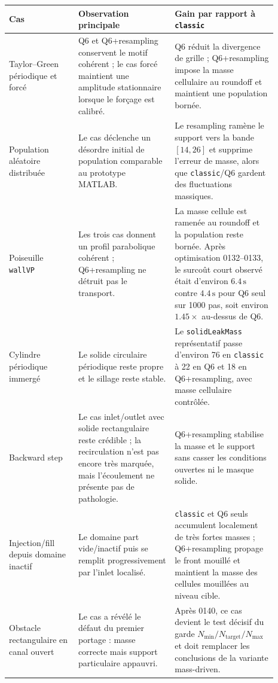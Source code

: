 \documentclass[11pt,a4paper]{article}
\begin{document}
\begin{center}
\small
\begin{tabular}{p{0.23\linewidth}p{0.32\linewidth}p{0.34\linewidth}}
\toprule
Cas & Observation principale & Gain par rapport à \texttt{classic} \\
\midrule
Taylor--Green périodique et forcé & Q6 et Q6+resampling conservent le motif cohérent ; le cas forcé maintient une amplitude stationnaire lorsque le forçage est calibré. & Q6 réduit la divergence de grille ; Q6+resampling impose la masse cellulaire au roundoff et maintient une population bornée. \\
Population aléatoire distribuée & Le cas déclenche un désordre initial de population comparable au prototype MATLAB. & Le resampling ramène le support vers la bande $[14,26]$ et supprime l'erreur de masse, alors que \texttt{classic}/Q6 gardent des fluctuations massiques. \\
Poiseuille \texttt{wallVP} & Les trois cas donnent un profil parabolique cohérent ; Q6+resampling ne détruit pas le transport. & La masse cellule est ramenée au roundoff et la population reste bornée. Après optimisation 0132--0133, le surcoût court observé était d'environ $6.4\,\mathrm{s}$ contre $4.4\,\mathrm{s}$ pour Q6 seul sur 1000 pas, soit environ $1.45\times$ au-dessus de Q6. \\
Cylindre périodique immergé & Le solide circulaire périodique reste propre et le sillage reste stable. & Le \texttt{solidLeakMass} représentatif passe d'environ 76 en \texttt{classic} à 22 en Q6 et 18 en Q6+resampling, avec masse cellulaire contrôlée. \\
Backward step & Le cas inlet/outlet avec solide rectangulaire reste crédible ; la recirculation n'est pas encore très marquée, mais l'écoulement ne présente pas de pathologie. & Q6+resampling stabilise la masse et le support sans casser les conditions ouvertes ni le masque solide. \\
Injection/fill depuis domaine inactif & Le domaine part vide/inactif puis se remplit progressivement par l'inlet localisé. & \texttt{classic} et Q6 seuls accumulent localement de très fortes masses ; Q6+resampling propage le front mouillé et maintient la masse des cellules mouillées au niveau cible. \\
Obstacle rectangulaire en canal ouvert & Le cas a révélé le défaut du premier portage : masse correcte mais support particulaire appauvri. & Après 0140, ce cas devient le test décisif du garde $N_{\min}/N_{\mathrm{target}}/N_{\max}$ et doit remplacer les conclusions de la variante mass-driven. \\
\bottomrule
\end{tabular}
\end{center}
\end{document}
